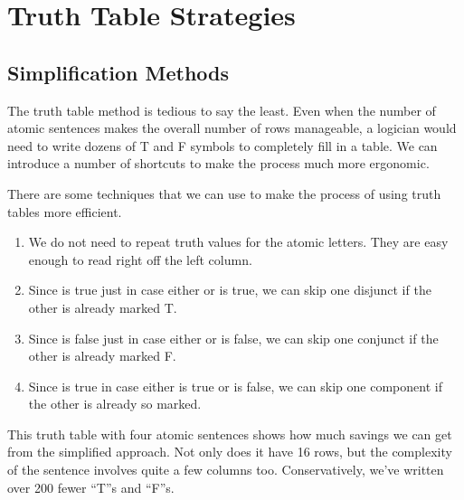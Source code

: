 \section{Truth Table Strategies}

\subsection{Simplification Methods}

The truth table method is tedious to say the least. Even when the number of
atomic sentences makes the overall number of rows manageable, a logician would
need to write dozens of T and F symbols to completely fill in a table. We can
introduce a number of shortcuts to make the process much more ergonomic.

\begin{observation}
  \label{obs:tt-simplified-methods}
  There are some techniques that we can use to make the process of using truth
  tables more efficient.
  \begin{enumerate}
  \item We do not need to repeat truth values for the atomic letters. They are
    easy enough to read right off the left column.
  \item Since \ephi\eor\spsi is true just in case either \sphi or \spsi is true,
    we can skip one disjunct if the other is already marked T.
  \item Since \ephi\eand\spsi is false just in case either \sphi or \spsi is
    false, we can skip one conjunct if the other is already marked F.
  \item Since \ephi\eif\spsi is true in case either \spsi is true or \sphi is
    false, we can skip one component if the other is already so marked.
  \end{enumerate}
\end{observation}

This truth table with four atomic sentences shows how much savings we can get
from the simplified approach. Not only does it have 16 rows, but the complexity
of the sentence involves quite a few columns too. Conservatively, we've written
over 200 fewer ``T''s and ``F''s. 

